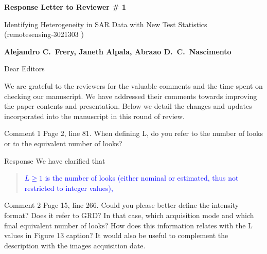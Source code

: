 \documentclass[11pt]{report}
\begin{document}
\begin{center}
\large{\textbf{Response Letter to Reviewer \# 1}}

\vglue 0.3cm

\huge{ Identifying Heterogeneity in SAR Data with New Test Statistics\\ (remotesensing-3021303 )}
\end{center}

\begin{center}
\textbf{Alejandro C.\ Frery, Janeth Alpala, Abraao D.\ C.\ Nascimento }
\end{center}

\date{\today}



\vspace{2cm}
\noindent Dear Editors
\bigskip

\noindent We are grateful to the reviewers for the valuable comments and the time spent on checking our manuscript. 
We have addressed their comments towards improving the paper contents and presentation. 
Below we detail the changes and updates incorporated into the manuscript in this round of review.

\medskip


\begin{reviewbox}{Comment 1}
Page 2, line 81. When defining L, do you refer to the number of looks or to the equivalent number of looks?

\end{reviewbox}

\begin{responsebox}{Response}
We have clarified that
\begin{quote}
	\textcolor{blue}{\(L \geq 1\) is the number of looks (either nominal or estimated, thus not restricted to integer values),}
\end{quote}
\end{responsebox}

\vspace{3em}
\begin{reviewbox}{Comment 2}
Page 15, line 266. Could you please better define the intensity format? Does it refer to GRD? In that case, which acquisition mode and which final equivalent number of looks? How does this information relates with the L values in Figure 13 caption? It would also be useful to complement the description with the images acquisition date.
\end{reviewbox}
\end{document}
